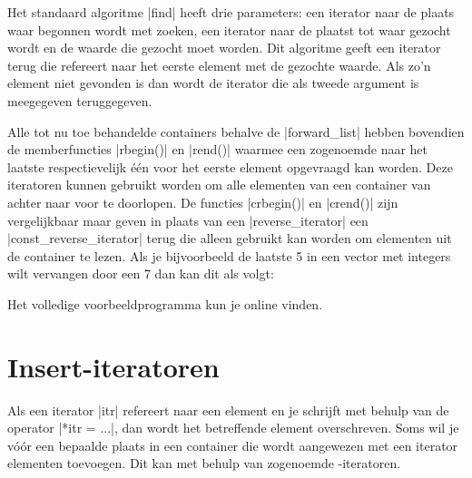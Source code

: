 \begin{cpplstShortInline}

Het standaard algoritme |find| heeft drie parameters: een iterator naar de plaats waar begonnen wordt met zoeken, een iterator naar de plaatst tot waar gezocht wordt en de waarde die gezocht moet worden.
Dit algoritme geeft een iterator terug die refereert naar het eerste element met de gezochte waarde.
Als zo'n element niet gevonden is dan wordt de iterator die als tweede argument is meegegeven teruggegeven.

Alle tot nu toe behandelde containers behalve de |forward_list| hebben bovendien de memberfuncties |rbegin()| en |rend()| waarmee een zogenoemde \emph{} naar het laatste respectievelijk één voor het eerste element opgevraagd kan worden.
Deze iteratoren kunnen gebruikt worden om alle elementen van een container van achter naar voor te doorlopen.
De functies |crbegin()| en |crend()| zijn vergelijkbaar maar geven in plaats van een |reverse_iterator| een |const_reverse_iterator| terug die alleen gebruikt kan worden om elementen uit de container te lezen.
Als je bijvoorbeeld de laatste 5 in een vector met integers wilt vervangen door een 7 dan kan dit als volgt:


Het volledige voorbeeldprogramma  kun je online vinden.

\section{Insert\hyp{}iteratoren}
\label{sec:insitr}
Als een iterator |itr| refereert naar een element en je schrijft met behulp van de  operator |*itr = ...|, dan wordt het betreffende element overschreven.
Soms wil je vóór een bepaalde plaats in een container die wordt aangewezen met een iterator elementen toevoegen.
Dit kan met behulp van zogenoemde \hyp{}iteratoren.


\end{cpplstShortInline}

